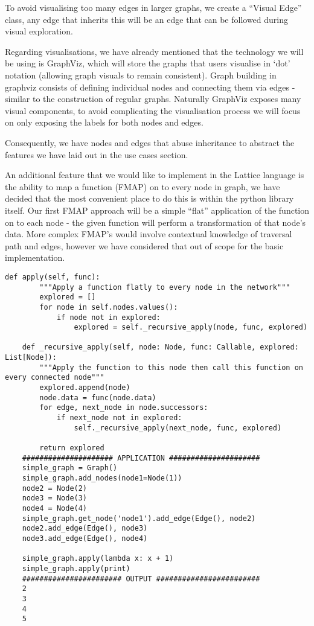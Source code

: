 To avoid visualising too many edges in larger graphs, we create a ``Visual Edge'' class, any edge that inherits this
will be an edge that can be followed during visual exploration.

Regarding visualisations, we have already mentioned that the technology we will be using is GraphViz, which will store
the graphs that users visualise in `dot' notation (allowing graph visuals to remain consistent).
Graph building in graphviz consists of defining individual nodes and connecting them via edges - similar to the
construction of regular graphs.
Naturally GraphViz exposes many visual components, to avoid complicating the visualisation process we will focus on
only exposing the labels for both nodes and edges.

Consequently, we have nodes and edges that abuse inheritance to abstract the features we have laid out in the use cases
section.

An additional feature that we would like to implement in the Lattice language is the ability to map a function (FMAP) on
to  every node in graph, we have decided that the most convenient place to do this is within the python library itself.
Our first FMAP approach will be a simple ``flat'' application of the function on to each node - the given function will
perform a transformation of that node's data.
More complex FMAP's would involve contextual knowledge of traversal path and edges, however we have considered that out
of scope for the basic implementation.

\begin{lstlisting}[caption={FMAP on a graph including examples},captionpos=b,label={lst:python-fmap-graph}]
    def apply(self, func):
        """Apply a function flatly to every node in the network"""
        explored = []
        for node in self.nodes.values():
            if node not in explored:
                explored = self._recursive_apply(node, func, explored)

    def _recursive_apply(self, node: Node, func: Callable, explored: List[Node]):
        """Apply the function to this node then call this function on every connected node"""
        explored.append(node)
        node.data = func(node.data)
        for edge, next_node in node.successors:
            if next_node not in explored:
                self._recursive_apply(next_node, func, explored)

        return explored
    ##################### APPLICATION #####################
    simple_graph = Graph()
    simple_graph.add_nodes(node1=Node(1))
    node2 = Node(2)
    node3 = Node(3)
    node4 = Node(4)
    simple_graph.get_node('node1').add_edge(Edge(), node2)
    node2.add_edge(Edge(), node3)
    node3.add_edge(Edge(), node4)

    simple_graph.apply(lambda x: x + 1)
    simple_graph.apply(print)
    ####################### OUTPUT ########################
    2
    3
    4
    5
\end{lstlisting}

